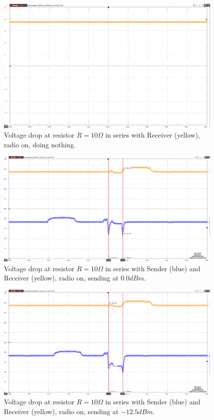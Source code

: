 \begin{figure}[h]
	\centering
	\includegraphics[width=1\linewidth]{implementation/energylab/fig/radioOn_idle.png}
	\caption{Voltage drop at resistor $R=10\Omega$ in series with Receiver (yellow), radio on, doing nothing.}
	\label{fig:radioOn_idle}
\end{figure}

\begin{figure}[h]
	\centering
	\includegraphics[width=1\linewidth]{implementation/energylab/fig/radioOn_sendHighSignal.png}
	\caption{Voltage drop at resistor $R=10\Omega$ in series with Sender (blue) and Receiver (yellow), radio on, sending at $0.0dBm$.}
	\label{fig:radioOn_sendHighSignal}
\end{figure}

\begin{figure}[h]
	\centering
	\includegraphics[width=1\linewidth]{implementation/energylab/fig/radioOn_sendMidSignal.png}
	\caption{Voltage drop at resistor $R=10\Omega$ in series with Sender (blue) and Receiver (yellow), radio on, sending at $-12.5dBm$.}
	\label{fig:radioOn_sendMidSignal}
\end{figure}


